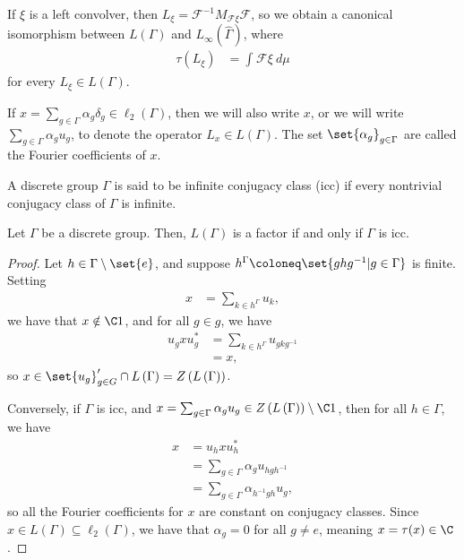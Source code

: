 \documentclass[10pt]{mypackage}
\begin{document}
If $\xi$ is a left convolver, then $L_{\xi} = \mathcal{F}^{-1}M_{\mathcal{F}\xi} \mathcal{F}$, so we obtain a canonical isomorphism between $L\left( \Gamma \right)$ and $L_{\infty}\left( \hat{\Gamma} \right)$, where
\begin{align*}
  \tau\left( L_{\xi} \right) &= \int_{}^{} \mathcal{F}\xi\:d\mu
\end{align*}
for every $L_{\xi}\in L\left( \Gamma \right)$.

If $ x = \sum_{g\in \Gamma}\alpha_g\delta_g\in \ell_2\left( \Gamma \right) $, then we will also write $x$, or we will write $\sum_{g\in \Gamma}\alpha_gu_g$, to denote the operator $L_x\in L\left( \Gamma \right)$. The set $\set{\alpha_g}_{g\in \Gamma}$ are called the Fourier coefficients of $x$.
\begin{definition}
  A discrete group $\Gamma$ is said to be infinite conjugacy class (icc) if every nontrivial conjugacy class of $\Gamma$ is infinite.
\end{definition}
\begin{theorem}
  Let $\Gamma$ be a discrete group. Then, $L\left( \Gamma \right)$ is a factor if and only if $\Gamma$ is icc.
\end{theorem}
\begin{proof}
  Let $h\in \Gamma\setminus \set{e}$, and suppose $h^{\Gamma}\coloneq \set{ghg^{-1} | g\in \Gamma}$ is finite. Setting
  \begin{align*}
    x &= \sum_{k\in h^{\Gamma}} u_k,
  \end{align*}
  we have that $x\notin \C 1$, and for all $g\in g$, we have
  \begin{align*}
    u_g x u_g^{\ast} &= \sum_{k\in h^{\Gamma}}u_{gkg^{-1}}\\
                     &= x,
  \end{align*}
  so $x\in \set{u_g}_{g\in G}'\cap L\left( \Gamma \right) = Z\left( L\left( \Gamma \right) \right)$.

  Conversely, if $\Gamma$ is icc, and $x = \sum_{g\in \Gamma}\alpha_gu_g\in Z\left( L\left( \Gamma \right) \right)\setminus \C 1$, then for all $h\in \Gamma$, we have
  \begin{align*}
    x &= u_h x u_h^{\ast}\\
      &= \sum_{g\in \Gamma} \alpha_g u_{hgh^{-1}}\\
      &= \sum_{g\in \Gamma} \alpha_{h^{-1}gh}u_g,
  \end{align*}
  so all the Fourier coefficients for $x$ are constant on conjugacy classes. Since $x\in L\left( \Gamma \right) \subseteq \ell_2\left( \Gamma \right)$, we have that $\alpha_g = 0$ for all $g\neq e$, meaning $x = \tau(x)\in \C$.
\end{proof}
\end{document}
